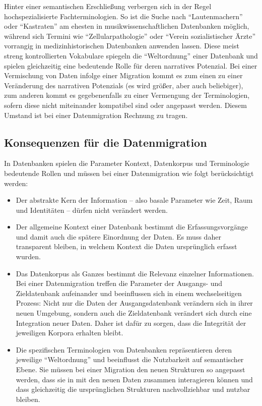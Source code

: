 \documentclass[a4paper,
fontsize=11pt,
oneside,
numbers=noperiodatend,
parskip=half-,
bibliography=totoc,
final
]{scrartcl}
\begin{document}
Hinter einer semantischen Erschließung verbergen sich in der Regel
hochspezialisierte Fachterminologien. So ist die Suche nach
\enquote{Lautenmachern} oder \enquote{Kastraten} am ehesten in
musikwissenschaftlichen Datenbanken möglich, während sich Termini wie
\enquote{Zellularpathologie} oder \enquote{Verein sozialistischer Ärzte}
vorrangig in medizinhistorischen Datenbanken anwenden lassen. Diese
meist streng kontrollierten Vokabulare spiegeln die
\enquote{Weltordnung} einer Datenbank und spielen gleichzeitig eine
bedeutende Rolle für deren narratives Potenzial. Bei einer Vermischung
von Daten infolge einer Migration kommt es zum einen zu einer
Veränderung des narrativen Potenzials (es wird größer, aber auch
beliebiger), zum anderen kommt es gegebenenfalls zu einer Vermengung der
Terminologien, sofern diese nicht miteinander kompatibel sind oder
angepasst werden. Diesem Umstand ist bei einer Datenmigration Rechnung
zu tragen.

\subsection*{Konsequenzen für die
Datenmigration}\label{konsequenzen-fuxfcr-die-datenmigration}

In Datenbanken spielen die Parameter Kontext, Datenkorpus und
Terminologie bedeutende Rollen und müssen bei einer Datenmigration wie
folgt berücksichtigt werden:

\begin{itemize}
\item
  Der abstrakte Kern der Information -- also basale Parameter wie Zeit,
  Raum und Identitäten -- dürfen nicht verändert werden.
\item
  Der allgemeine Kontext einer Datenbank bestimmt die Erfassungsvorgänge
  und damit auch die spätere Einordnung der Daten. Es muss daher
  transparent bleiben, in welchem Kontext die Daten ursprünglich erfasst
  wurden.
\item
  Das Datenkorpus als Ganzes bestimmt die Relevanz einzelner
  Informationen. Bei einer Datenmigration treffen die Parameter der
  Ausgangs- und Zieldatenbank aufeinander und beeinflussen sich in einem
  wechselseitigen Prozess: Nicht nur die Daten der Ausgangsdatenbank
  verändern sich in ihrer neuen Umgebung, sondern auch die Zieldatenbank
  verändert sich durch eine Integration neuer Daten. Daher ist dafür zu
  sorgen, dass die Integrität der jeweiligen Korpora erhalten bleibt.
\item
  Die spezifischen Terminologien von Datenbanken repräsentieren deren
  jeweilige \enquote{Weltordnung} und beeinflusst die Nutzbarkeit auf
  semantischer Ebene. Sie müssen bei einer Migration den neuen
  Strukturen so angepasst werden, dass sie in mit den neuen Daten
  zusammen interagieren können und dass gleichzeitig die ursprünglichen
  Strukturen nachvollziehbar und nutzbar bleiben.
\end{itemize}
\end{document}
